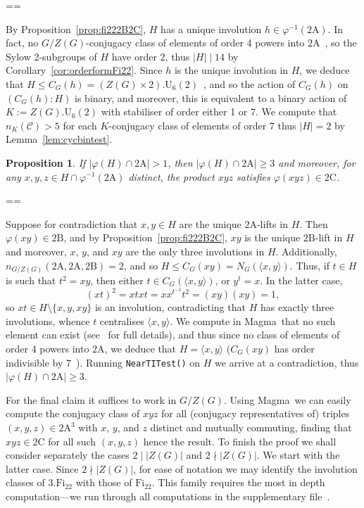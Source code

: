 \documentclass[11pt, a4paper]{amsart}
\makeatletter
\newcommand{\magma}{{\sc Magma}}
\newtheorem{prop}[thm]{Proposition}
\renewcommand{\proofname}{Proof}
\renewenvironment{proof}[1][\proofname]{\par
  \pushQED{\qed}  \normalfont \partopsep=\z@skip \topsep=\z@skip
  \trivlist
  \item[\hskip\labelsep
        \scshape
    #1\@addpunct{.}]\ignorespaces
}{  \popQED\endtrivlist\@endpefalse
}
\makeatother
\begin{document}
\begin{proof}
            By Proposition~\ref{prop:fi222B2C}, $H$ has a unique involution $h\in\varphi^{-1}(\mathrm{2A})$. In fact, no $G/Z(G)$-conjugacy class of elements of order 4 powers into $\mathrm{2A}$~\cite{atlas}, so the Sylow 2-subgroups of $H$ have order 2, thus $|H|\mid14$ by Corollary~\ref{cor:orderformFi22}. Since $h$ is the unique involution in $H$, we deduce that $H\leq C_G(h)=(Z(G)\times2).\mathrm{U}_6(2)$~\cite{atlas}, and so the action of $C_G(h)$ on $(C_G(h) : H)$ is binary, and moreover, this is equivalent to a binary action of $K:=Z(G).\mathrm{U}_6(2)$ with stabiliser of order either 1 or 7. We compute that $n_K(\mathcal{C})>5$ for each $K$-conjugacy class of elements of order 7 thus $|H|=2$ by Lemma~\ref{lem:cycbintest}.
    \end{proof}


\begin{prop}\label{prop:fi222C}
    If $|\varphi(H) \cap \mathrm{2A}|>1$, then  $|\varphi(H) \cap \mathrm{2A}|\geq 3$ and moreover, for any $x,y,z\in H \cap \varphi^{-1}(\mathrm{2A})$ distinct, the product $xyz$ satisfies $\varphi(xyz)\in \mathrm{2C}$.
\end{prop}
\begin{proof}
    Suppose for contradiction that $x,y\in H$ are the unique $\mathrm{2A}$-lifts in $H$. Then $\varphi(xy)\in\mathrm{2B}$, and by Proposition~\ref{prop:fi222B2C}, $xy$ is the unique $\mathrm{2B}$-lift in $H$ and moreover, $x$, $y$, and $xy$ are the only three involutions in $H$. Additionally, $n_{G/Z(G)}(\mathrm{2A,2A,2B})=2$, and so $H\leq C_G(xy)=N_G(\langle x,y\rangle)$. Thus, if $t\in H$ is such that $t^2=xy$, then either $t\in C_G(\langle x,y\rangle)$, or $y^t=x$. In the latter case, $$(xt)^2=xtxt=xx^{t^{-1}}t^2=(xy)(xy)=1,$$ so $xt\in H\setminus\{x,y,xy\}$ is an involution, contradicting that $H$ has exactly three involutions, whence $t$ centralises $\langle x,y\rangle$. We compute in \magma~that no such element can exist (see~\cite{comps} for full details), and thus since no class of elements of order 4 powers into $\mathrm{2A}$, we deduce that $H=\langle x,y\rangle$ ($C_G(xy)$ has order indivisible by 7~\cite{atlas}). Running {\tt NearTITest()} on $H$ we arrive at a contradiction, thus $|\varphi(H) \cap \mathrm{2A}|\geq 3$.

    For the final claim it suffices to work in $G/Z(G)$. Using \magma~we can easily compute the conjugacy class of $xyz$ for all (conjugacy representatives of) triples $(x,y,z)\in\mathrm{2A}^3$ with $x$, $y$, and $z$ distinct and mutually commuting, finding that $xyz\in\mathrm{2C}$ for all such $(x,y,z)$ hence the result.  
\end{proof}
To finish the proof we shall consider separately the cases $2\mid |Z(G)|$ and $2\nmid |Z(G)|$. We start with the latter case. Since $2\nmid |Z(G)|$, for ease of notation we may identify the involution classes of $3.\mathrm{Fi}_{22}$ with those of $\mathrm{Fi}_{22}$. This family requires the most in depth computation---we run through all computations in the supplementary file~\cite{comps}.
\end{document}
